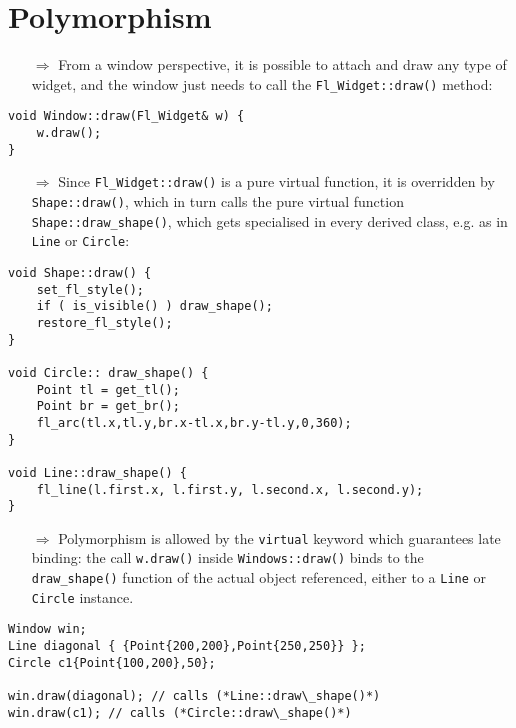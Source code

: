 \documentclass[10pt]{article}
\begin{document}
\section{Polymorphism}
\small
\begin{enumerate}
\item[$\Rightarrow$] From a window perspective, it is possible to attach and draw any type of widget, and the window just needs to call the \texttt{Fl\_Widget::draw()} method:
\end{enumerate}
\begin{lstlisting}
void Window::draw(Fl_Widget& w) {
    w.draw();
}
\end{lstlisting}
\begin{enumerate}
\item[$\Rightarrow$] Since \texttt{Fl\_Widget::draw()} is a pure virtual function, it is overridden by \texttt{Shape::draw()}, which in turn calls the pure virtual function \texttt{Shape::draw\_shape()}, which gets specialised in every derived class, e.g. as in \texttt{Line} or \texttt{Circle}:
\end{enumerate}
\begin{lstlisting}
void Shape::draw() {
    set_fl_style();
    if ( is_visible() ) draw_shape();
    restore_fl_style();
}

void Circle:: draw_shape() {
    Point tl = get_tl();
    Point br = get_br();
    fl_arc(tl.x,tl.y,br.x-tl.x,br.y-tl.y,0,360);
}

void Line::draw_shape() {
    fl_line(l.first.x, l.first.y, l.second.x, l.second.y);
}
\end{lstlisting}
\begin{enumerate}
\item[$\Rightarrow$] Polymorphism is allowed by the \texttt{virtual} keyword which guarantees late binding: the call \texttt{w.draw()} inside \texttt{Windows::draw()} binds to the \texttt{draw\_shape()} function of the actual object referenced, either to a \texttt{Line} or \texttt{Circle} instance.
\end{enumerate}
\begin{lstlisting}
Window win;
Line diagonal { {Point{200,200},Point{250,250}} };
Circle c1{Point{100,200},50};

win.draw(diagonal); // calls (*Line::draw\_shape()*)
win.draw(c1); // calls (*Circle::draw\_shape()*)
\end{lstlisting}
%
%
\end{document}
